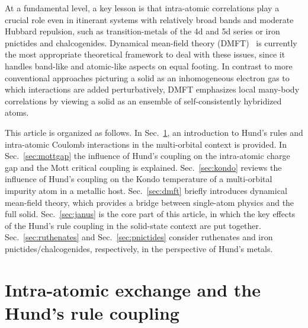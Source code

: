 \documentclass[]{ar2e-changed}%
\begin{document}
At a fundamental level, a key lesson is that intra-atomic correlations play a crucial role even 
in itinerant systems with relatively broad bands and moderate Hubbard repulsion, 
such as transition-metals of the 4d and 5d series or iron pnictides and chalcogenides. 
%
Dynamical mean-field theory (DMFT)~\cite{georges_review_dmft,kotliar_dmft_physicstoday} 
is currently the most appropriate theoretical framework to deal 
with these issues, since it handles band-like and atomic-like aspects on equal footing. 
%
In contrast to more conventional approaches picturing a solid as an inhomogeneous electron gas to which interactions 
are added perturbatively, DMFT emphasizes local many-body correlations by viewing 
a solid as an ensemble of self-consistently hybridized atoms.  
% 

This article is organized as follows. 
%
In Sec.~\ref{sec:hund}, an introduction to Hund's rules and intra-atomic Coulomb 
interactions in the multi-orbital context is provided. 
In Sec.~\ref{sec:mottgap} the influence of Hund's coupling on the intra-atomic charge gap and 
the Mott critical coupling is explained. 
Sec.~\ref{sec:kondo} reviews the influence of Hund's coupling on the Kondo temperature of 
a multi-orbital impurity atom in a metallic host. 
Sec.~\ref{sec:dmft} briefly introduces dynamical mean-field theory, which provides a bridge 
between single-atom physics and the full solid. 
Sec.~\ref{sec:janus} is the core part of this article, in which the key effects of the Hund's rule coupling in the 
solid-state context are put together. 
Sec.~\ref{sec:ruthenates} and Sec.~\ref{sec:pnictides} consider ruthenates and 
iron pnictides/chalcogenides, respectively, in the perspective of Hund's metals. 


\section{Intra-atomic exchange and the Hund's rule coupling}
\label{sec:hund}
\end{document}
